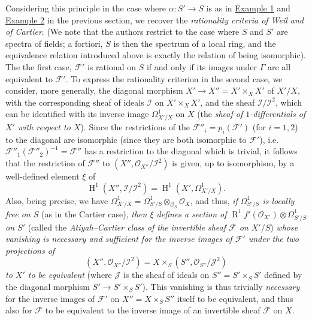 \documentclass{article}
\newcommand{\oldpage}[1]{\marginpar{\footnotesize$\Big\vert$ \textit{p.~#1}}}
\theoremstyle{definition}
\theoremstyle{definition}
\theoremstyle{definition}
\theoremstyle{definition}
\theoremstyle{remark}
\begin{document}
Considering this principle in the case where \(\alpha\colon S'\to S\) is as in \protect\hyperlink{fga-3-i-section-B.3-example-1}{Example 1} and \protect\hyperlink{fga-3-i-section-B.3-example-2}{Example 2} in the previous section, we recover the \emph{rationality criteria of Weil and of Cartier}.
\oldpage{190-25}(We note that the authors restrict to the case where \(S\) and \(S'\) are spectra of fields;
a fortiori, \(S\) is then the spectrum of a local ring, and the equivalence relation introduced above is exactly the relation of being isomorphic).
The the first case, \({\mathcal{F}}'\) is rational on \(S\) if and only if its images under \(\Gamma\) are all equivalent to \({\mathcal{F}}'\).
To express the rationality criterion in the second case, we consider, more generally, the diagonal morphism \(X'\to X''=X'\times_X X'\) of \(X'/X\), with the corresponding sheaf of ideals \({\mathscr{I}}\) on \(X'\times_X X'\), and the sheaf \({\mathscr{I}}/{\mathscr{I}}^2\), which can be identified with its inverse image \(\Omega_{X'/X}^1\) on \(X\) (the \emph{sheaf of \(1\)-differentials of \(X'\) with respect to \(X\)}).
Since the restrictions of the \({\mathcal{F}}''_i=p_i({\mathcal{F}}')\) (for \(i=1,2\)) to the diagonal are isomorphic (since they are both isomorphic to \({\mathcal{F}}'\)), i.e.~\({\mathcal{F}}''_1({\mathcal{F}}''_2)^{-1}={\mathcal{F}}''\) has a restriction to the diagonal which is trivial, it follows that the restriction of \({\mathcal{F}}''\) to \((X'',{\mathscr{O}}_{X''}/{\mathscr{I}}^2)\) is given, up to isomorphism, by a well-defined element \(\xi\) of
\[
  \operatorname{H}^1(X'',{\mathscr{I}}/{\mathscr{I}}^2) = \operatorname{H}^1(X',\Omega_{X'/X}^1).
\]
Also, being precise, we have \(\Omega_{X'/X}^1=\Omega_{S'/S}^1\otimes_{{\mathscr{O}}_S}{\mathscr{O}}_X\), and thus, \emph{if \(\Omega_{S'/S}^1\) is locally free on \(S\)} (as in the Cartier case), \emph{then \(\xi\) defines a section of \(\operatorname{R}^1f'({\mathscr{O}}_{X'})\otimes\Omega_{S'/S}^1\) on \(S'\)} (called the \emph{Atiyah--Cartier class of the invertible sheaf \({\mathcal{F}}\) on \(X'/S\)}) \emph{whose vanishing is necessary and sufficient for the inverse images of \({\mathcal{F}}'\) under the two projections of}
\[
  (X'',{\mathscr{O}}_{X''}/{\mathscr{I}}^2) = X\times_S(S'',{\mathscr{O}}_{S''}/{\mathscr{J}}^2)
\]
\emph{to \(X'\) to be equivalent} (where \({\mathscr{J}}\) is the sheaf of ideals on \(S''=S'\times_S S'\) defined by the diagonal morphism \(S'\to S'\times_S S'\)).
This vanishing is thus trivially \emph{necessary} for the inverse images of \({\mathcal{F}}'\) on \(X''=X\times_S S''\) itself to be equivalent, and thus also for \({\mathcal{F}}\) to be equivalent to the inverse image of an invertible sheaf \({\mathcal{F}}\) on \(X\).
\end{document}
